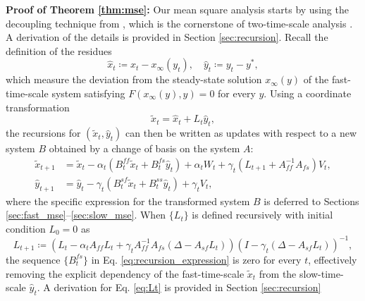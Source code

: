 \textbf{Proof of Theorem \ref{thm:mse}:}
Our mean square analysis starts by using the decoupling technique from \citep{konda2004convergence}, which is the cornerstone of two-time-scale analysis \citep{kaledin2020finite,haque2023tightfinitetimebounds}.
A derivation of the details is provided in Section \ref{sec:recursion}.
Recall the definition of the residues
\begin{equation}
    \hat{x}_t \coloneqq x_t - x_\infty (y_t), \quad \hat{y}_t \coloneqq y_t - y^* ,
\end{equation}
which measure the deviation from the steady-state solution $x_\infty (y)$ of the fast-time-scale system satisfying $F(x_\infty (y), y) = 0$ for every $y$.
Using a coordinate transformation 
\begin{equation}
    \tilde{x}_t = \hat{x}_t + L_t \hat{y}_t ,
\end{equation}
the recursions for $(\tilde{x}_t, \hat{y}_t)$ can then be written as updates with respect to a new system $B$ obtained by a change of basis on the system $A$:
\begin{equation}\label{eq:recursion_expression}
    \begin{split}
        \tilde{x}_{t+1} &= \tilde{x}_t - \alpha_t (B_t^{ff} \tilde{x}_t + B_t^{fs} \hat{y}_t) + \alpha_t W_t + \gamma_t (L_{t+1} + A_{ff}^{-1} A_{fs}) V_t ,
        \\
        \hat{y}_{t+1} &= \hat{y}_t - \gamma_t (B_t^{sf} \tilde{x}_t + B_t^{ss} \hat{y}_t) + \gamma_t V_t ,        
    \end{split}
\end{equation}
where the specific expression for the transformed system $B$ is deferred to Sections \ref{sec:fast_mse}--\ref{sec:slow_mse}.
When $\{L_t\}$ is defined recursively with initial condition $L_0 = 0$ as
\begin{equation}\label{eq:Lt}
    L_{t+1} \coloneqq \left(L_t - \alpha_t A_{ff} L_t + \gamma_t A_{ff}^{-1} A_{fs}(\Delta - A_{sf} L_t)\right) (I - \gamma_t (\Delta - A_{sf} L_t))^{-1}  ,
\end{equation}
the sequence $\{B_t^{fs}\}$ in Eq. \eqref{eq:recursion_expression} is zero for every $t$, effectively removing the explicit dependency of the fast-time-scale $\tilde{x}_t$ from the slow-time-scale $\hat{y}_t$.
A derivation for Eq. \eqref{eq:Lt} is provided in Section \ref{sec:recursion}
